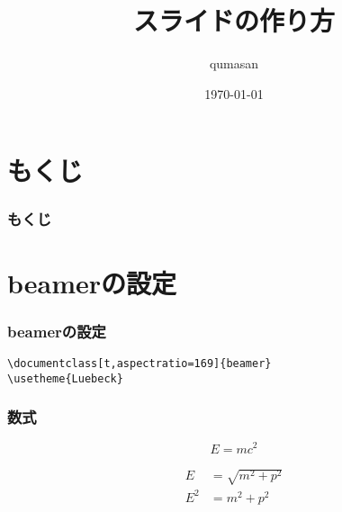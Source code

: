 \documentclass[t,aspectratio=169]{beamer}
\title{スライドの作り方}
\author{qumasan}
\institute{KumaROOT}
\date{\today}
\begin{document}
\begin{frame}
\titlepage
\end{frame}

\section*{もくじ}
\begin{frame}
    \frametitle{もくじ}
    \tableofcontents
\end{frame}

\section{beamerの設定}
\begin{frame}[fragile]
    \frametitle{beamerの設定}
    \begin{verbatim}
\documentclass[t,aspectratio=169]{beamer}
\usetheme{Luebeck}
    \end{verbatim}
\end{frame}








\begin{frame}
    \frametitle{数式}
    \begin{equation}
        E = mc^{2}
    \end{equation}

    \begin{align}
        E &= \sqrt{m^{2} + p^{2}}\\
        E^{2} &= m^{2} + p^{2}
    \end{align}

\end{frame}
\end{document}
